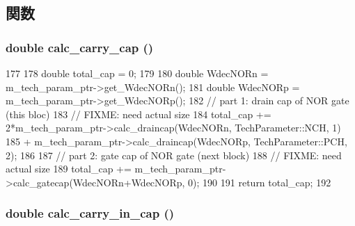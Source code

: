 \subsection{関数}
\hypertarget{classRRArbiter_a2f477f24564e2e59b52b6ae201bb6170}{
\subsubsection[{calc\_\-carry\_\-cap}]{\setlength{\rightskip}{0pt plus 5cm}double calc\_\-carry\_\-cap ()}}
\label{classRRArbiter_a2f477f24564e2e59b52b6ae201bb6170}



\begin{DoxyCode}
177 {
178     double total_cap = 0;
179 
180     double WdecNORn = m_tech_param_ptr->get_WdecNORn();
181     double WdecNORp = m_tech_param_ptr->get_WdecNORp();
182     // part 1: drain cap of NOR gate (this bloc)
183     // FIXME: need actual size
184     total_cap += 2*m_tech_param_ptr->calc_draincap(WdecNORn, TechParameter::NCH, 
      1)
185         + m_tech_param_ptr->calc_draincap(WdecNORp, TechParameter::PCH, 2);
186 
187     // part 2: gate cap of NOR gate (next block)
188     // FIXME: need actual size
189     total_cap += m_tech_param_ptr->calc_gatecap(WdecNORn+WdecNORp, 0);
190 
191     return total_cap;
192 }
\end{DoxyCode}
\hypertarget{classRRArbiter_a664fec3f5e3d085af117c292b371162e}{
\subsubsection[{calc\_\-carry\_\-in\_\-cap}]{\setlength{\rightskip}{0pt plus 5cm}double calc\_\-carry\_\-in\_\-cap ()}}
\label{classRRArbiter_a664fec3f5e3d085af117c292b371162e}



